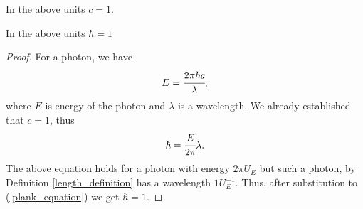 \documentclass[main.tex]{subfiles}
\begin{document}
\begin{corollary}
In the above units $c=1$.
\end{corollary}

\begin{corollary}
In the above units $\hbar = 1$
\end{corollary}
\begin{proof}
For a photon, we have 
\begin{equation}
E = \cfrac{2\pi \hbar c}{\lambda},
\end{equation}
where $E$ is energy of the photon and $\lambda$ is a wavelength. We already established that $c = 1$, thus
\begin{equation}
\label{plank_equation}
\hbar = \cfrac{E}{2\pi} \lambda.
\end{equation}
The above equation holds for a photon with energy $2\pi U_E$ but such a photon, by Definition \ref{length_definition} has a wavelength $1 U_E^{-1}$. Thus, after substitution to (\ref{plank_equation}) we get $\hbar=1$.
\end{proof}
\end{document}
